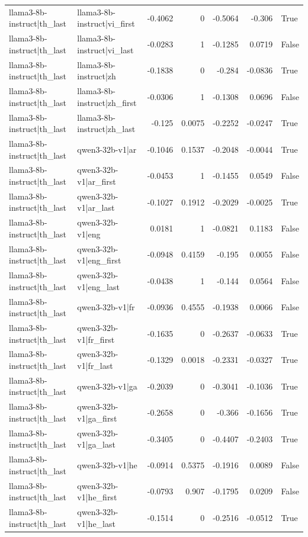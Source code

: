 \begin{table}
\begin{tabular}{l l r r r r l}
llama3-8b-instruct|th_last & llama3-8b-instruct|vi_first & -0.4062 & 0 & -0.5064 & -0.306 & True \\
llama3-8b-instruct|th_last & llama3-8b-instruct|vi_last & -0.0283 & 1 & -0.1285 & 0.0719 & False \\
llama3-8b-instruct|th_last & llama3-8b-instruct|zh & -0.1838 & 0 & -0.284 & -0.0836 & True \\
llama3-8b-instruct|th_last & llama3-8b-instruct|zh_first & -0.0306 & 1 & -0.1308 & 0.0696 & False \\
llama3-8b-instruct|th_last & llama3-8b-instruct|zh_last & -0.125 & 0.0075 & -0.2252 & -0.0247 & True \\
llama3-8b-instruct|th_last & qwen3-32b-v1|ar & -0.1046 & 0.1537 & -0.2048 & -0.0044 & True \\
llama3-8b-instruct|th_last & qwen3-32b-v1|ar_first & -0.0453 & 1 & -0.1455 & 0.0549 & False \\
llama3-8b-instruct|th_last & qwen3-32b-v1|ar_last & -0.1027 & 0.1912 & -0.2029 & -0.0025 & True \\
llama3-8b-instruct|th_last & qwen3-32b-v1|eng & 0.0181 & 1 & -0.0821 & 0.1183 & False \\
llama3-8b-instruct|th_last & qwen3-32b-v1|eng_first & -0.0948 & 0.4159 & -0.195 & 0.0055 & False \\
llama3-8b-instruct|th_last & qwen3-32b-v1|eng_last & -0.0438 & 1 & -0.144 & 0.0564 & False \\
llama3-8b-instruct|th_last & qwen3-32b-v1|fr & -0.0936 & 0.4555 & -0.1938 & 0.0066 & False \\
llama3-8b-instruct|th_last & qwen3-32b-v1|fr_first & -0.1635 & 0 & -0.2637 & -0.0633 & True \\
llama3-8b-instruct|th_last & qwen3-32b-v1|fr_last & -0.1329 & 0.0018 & -0.2331 & -0.0327 & True \\
llama3-8b-instruct|th_last & qwen3-32b-v1|ga & -0.2039 & 0 & -0.3041 & -0.1036 & True \\
llama3-8b-instruct|th_last & qwen3-32b-v1|ga_first & -0.2658 & 0 & -0.366 & -0.1656 & True \\
llama3-8b-instruct|th_last & qwen3-32b-v1|ga_last & -0.3405 & 0 & -0.4407 & -0.2403 & True \\
llama3-8b-instruct|th_last & qwen3-32b-v1|he & -0.0914 & 0.5375 & -0.1916 & 0.0089 & False \\
llama3-8b-instruct|th_last & qwen3-32b-v1|he_first & -0.0793 & 0.907 & -0.1795 & 0.0209 & False \\
llama3-8b-instruct|th_last & qwen3-32b-v1|he_last & -0.1514 & 0 & -0.2516 & -0.0512 & True \\

\end{tabular}
\end{table}

